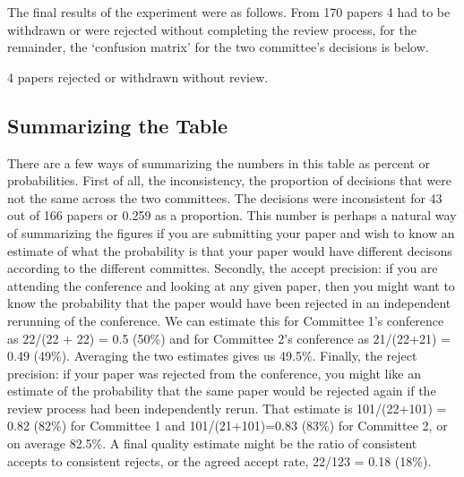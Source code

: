 \begin{flushright}
\end{flushright}

The final results of the experiment were as follows. From 170 papers 4
had to be withdrawn or were rejected without completing the review
process, for the remainder, the `confusion matrix' for the two
committee's decisions is below.



4 papers rejected or withdrawn without review.

\hypertarget{summarizing-the-table}{%
\subsection{Summarizing the Table}\label{summarizing-the-table}}

There are a few ways of summarizing the numbers in this table as percent
or probabilities. First of all, the inconsistency, the proportion of
decisions that were not the same across the two committees. The
decisions were inconsistent for 43 out of 166 papers or 0.259 as a
proportion. This number is perhaps a natural way of summarizing the
figures if you are submitting your paper and wish to know an estimate of
what the probability is that your paper would have different decisons
according to the different committes. Secondly, the accept precision: if
you are attending the conference and looking at any given paper, then
you might want to know the probability that the paper would have been
rejected in an independent rerunning of the conference. We can estimate
this for Committee 1's conference as 22/(22 + 22) = 0.5 (50\%) and for
Committee 2's conference as 21/(22+21) = 0.49 (49\%). Averaging the two
estimates gives us 49.5\%. Finally, the reject precision: if your paper
was rejected from the conference, you might like an estimate of the
probability that the same paper would be rejected again if the review
process had been independently rerun. That estimate is 101/(22+101) =
0.82 (82\%) for Committee 1 and 101/(21+101)=0.83 (83\%) for Committee
2, or on average 82.5\%. A final quality estimate might be the ratio of
consistent accepts to consistent rejects, or the agreed accept rate,
22/123 = 0.18 (18\%).

